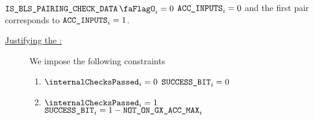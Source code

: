 \saNote{} \If $\isBlsPairingCheckData_{i} = 0$ \Then $\texttt{ACC\_INPUTS}_{i} = 0$ and the first pair corresponds to $\texttt{ACC\_INPUTS}_{i} = 1$.
\begin{description}
    \item[\underline{Justifying the \blsSuccessBit{}:}]
          We impose the following constraints
          \begin{enumerate}
              \item \If $\internalChecksPassed _{i}= 0$ \Then $\texttt{SUCCESS\_BIT} _{i} = 0$
              \item \If $\internalChecksPassed _{i}= 1$  \Then $\texttt{SUCCESS\_BIT}_{i} = 1 - \texttt{NOT\_ON\_GX\_ACC\_MAX} _{i}$
          \end{enumerate}
\end{description}
